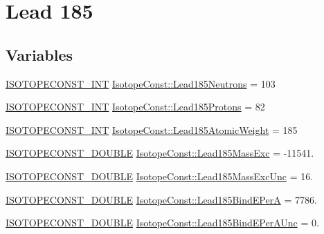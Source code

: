 \hypertarget{group___isotope_const-_lead-_pb185}{}\section{Lead 185}
\label{group___isotope_const-_lead-_pb185}
\subsection*{Variables}
\begin{DoxyCompactItemize}
\item 
\mbox{\hyperlink{group___isotope_const-_macros_ga5f18360b3e99483a35c32d789e62621c}{I\+S\+O\+T\+O\+P\+E\+C\+O\+N\+S\+T\+\_\+\+I\+NT}} \mbox{\hyperlink{group___isotope_const-_lead-_pb185_gaa65a87b174a94eaf50a1920c38d7aa32}{Isotope\+Const\+::\+Lead185\+Neutrons}} = 103
\item 
\mbox{\hyperlink{group___isotope_const-_macros_ga5f18360b3e99483a35c32d789e62621c}{I\+S\+O\+T\+O\+P\+E\+C\+O\+N\+S\+T\+\_\+\+I\+NT}} \mbox{\hyperlink{group___isotope_const-_lead-_pb185_gaa50a2fb0898eb1eb4fbb9c50d2f17db8}{Isotope\+Const\+::\+Lead185\+Protons}} = 82
\item 
\mbox{\hyperlink{group___isotope_const-_macros_ga5f18360b3e99483a35c32d789e62621c}{I\+S\+O\+T\+O\+P\+E\+C\+O\+N\+S\+T\+\_\+\+I\+NT}} \mbox{\hyperlink{group___isotope_const-_lead-_pb185_gafbd4796f4bda168c51f88aa16a1d0bb8}{Isotope\+Const\+::\+Lead185\+Atomic\+Weight}} = 185
\item 
\mbox{\hyperlink{group___isotope_const-_macros_ga8f45a7272ce02c0b4c65c44636ed719a}{I\+S\+O\+T\+O\+P\+E\+C\+O\+N\+S\+T\+\_\+\+D\+O\+U\+B\+LE}} \mbox{\hyperlink{group___isotope_const-_lead-_pb185_ga7bf53997df411c69ad4bd5a0ff3aed15}{Isotope\+Const\+::\+Lead185\+Mass\+Exc}} = -\/11541.
\item 
\mbox{\hyperlink{group___isotope_const-_macros_ga8f45a7272ce02c0b4c65c44636ed719a}{I\+S\+O\+T\+O\+P\+E\+C\+O\+N\+S\+T\+\_\+\+D\+O\+U\+B\+LE}} \mbox{\hyperlink{group___isotope_const-_lead-_pb185_ga8054bf57035e41acd6852fa91427f503}{Isotope\+Const\+::\+Lead185\+Mass\+Exc\+Unc}} = 16.
\item 
\mbox{\hyperlink{group___isotope_const-_macros_ga8f45a7272ce02c0b4c65c44636ed719a}{I\+S\+O\+T\+O\+P\+E\+C\+O\+N\+S\+T\+\_\+\+D\+O\+U\+B\+LE}} \mbox{\hyperlink{group___isotope_const-_lead-_pb185_ga9f881380ddd017188f65ecdf6db2112a}{Isotope\+Const\+::\+Lead185\+Bind\+E\+PerA}} = 7786.
\item 
\mbox{\hyperlink{group___isotope_const-_macros_ga8f45a7272ce02c0b4c65c44636ed719a}{I\+S\+O\+T\+O\+P\+E\+C\+O\+N\+S\+T\+\_\+\+D\+O\+U\+B\+LE}} \mbox{\hyperlink{group___isotope_const-_lead-_pb185_ga07c95247322a964dffc1fdd0f56ced6f}{Isotope\+Const\+::\+Lead185\+Bind\+E\+Per\+A\+Unc}} = 0.

\end{DoxyCompactItemize}
